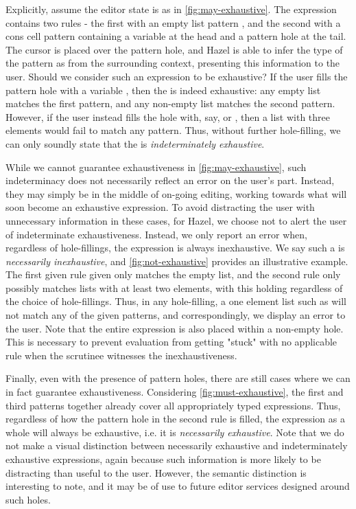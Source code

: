 Explicitly, assume the editor state is as in \autoref{fig:may-exhaustive}. The  expression contains two rules - the first with an empty list pattern \li{[]}, and the second with a cons cell pattern \li{::} containing a variable  at the head and a pattern hole at the tail. The cursor is placed over the pattern hole, and Hazel is able to infer the type of the pattern as \li{[Int]} from the surrounding context, presenting this information to the user. Should we consider such an expression to be exhaustive? If the user fills the pattern hole with a variable , then the  is indeed exhaustive: any empty list matches the first pattern, and any non-empty list matches the second pattern. However, if the user instead fills the hole with, say, \li{[]} or , then a list with three elements would fail to match any pattern. Thus, without further hole-filling, we can only soundly state that the  is \emph{indeterminately exhaustive}.

While we cannot guarantee exhaustiveness in \autoref{fig:may-exhaustive}, such indeterminacy does not necessarily reflect an error on the user's part. Instead, they may simply be in the middle of on-going editing, working towards what will soon become an exhaustive expression. To avoid distracting the user with unnecessary information in these cases, for Hazel, we choose not to alert the user of indeterminate exhaustiveness. Instead, we only report an error when, regardless of hole-fillings, the expression is always inexhaustive. We say such a  is \emph{necessarily inexhaustive}, and \autoref{fig:not-exhaustive} provides an illustrative example. The first given rule given only matches the empty list, and the second rule only possibly matches lists with at least two elements, with this holding regardless of the choice of hole-fillings. Thus, in any hole-filling, a one element list such as  will not match any of the given patterns, and correspondingly, we display an error to the user. Note that the entire  expression is also placed within a non-empty hole. This is necessary to prevent evaluation from getting "stuck" with no applicable rule when the scrutinee witnesses the inexhaustiveness.

Finally, even with the presence of pattern holes, there are still cases where we can in fact guarantee exhaustiveness. Considering \autoref{fig:must-exhaustive}, the first and third patterns together already cover all appropriately typed expressions. Thus, regardless of how the pattern hole in the second rule is filled, the  expression as a whole will always be exhaustive, i.e. it is \emph{necessarily exhaustive}. Note that we do not make a visual distinction between necessarily exhaustive and indeterminately exhaustive expressions, again because such information is more likely to be distracting than useful to the user. However, the semantic distinction is interesting to note, and it may be of use to future editor services designed around such holes. 


